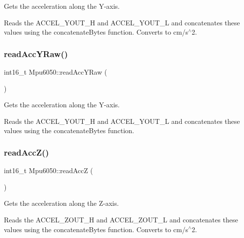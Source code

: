Gets the acceleration along the Y-\/axis. 

Reads the A\+C\+C\+E\+L\+\_\+\+Y\+O\+U\+T\+\_\+H and A\+C\+C\+E\+L\+\_\+\+Y\+O\+U\+T\+\_\+L and concatenates these values using the concatenate\+Bytes function. Converts to cm/s$^\wedge$2. \mbox{\label{classMpu6050_a3196a0eba88490f3699ddb50dc902604}} 
\subsubsection{\texorpdfstring{read\+Acc\+Y\+Raw()}{readAccYRaw()}}
{\footnotesize\ttfamily int16\+\_\+t Mpu6050\+::read\+Acc\+Y\+Raw (\begin{DoxyParamCaption}{ }\end{DoxyParamCaption})\hspace{0.3cm}{\ttfamily [virtual]}}



Gets the acceleration along the Y-\/axis. 

Reads the A\+C\+C\+E\+L\+\_\+\+Y\+O\+U\+T\+\_\+H and A\+C\+C\+E\+L\+\_\+\+Y\+O\+U\+T\+\_\+L and concatenates these values using the concatenate\+Bytes function. \mbox{\label{classMpu6050_a5b29cdb8209e51e810cc859acdd90fa7}} 
\subsubsection{\texorpdfstring{read\+Acc\+Z()}{readAccZ()}}
{\footnotesize\ttfamily int16\+\_\+t Mpu6050\+::read\+AccZ (\begin{DoxyParamCaption}{ }\end{DoxyParamCaption})\hspace{0.3cm}{\ttfamily [virtual]}}



Gets the acceleration along the Z-\/axis. 

Reads the A\+C\+C\+E\+L\+\_\+\+Z\+O\+U\+T\+\_\+H and A\+C\+C\+E\+L\+\_\+\+Z\+O\+U\+T\+\_\+L and concatenates these values using the concatenate\+Bytes function. Converts to cm/s$^\wedge$2. \mbox{\label{classMpu6050_a6d8a3f3f3a8935fb9349bfd7a6e9d2e6}} 
